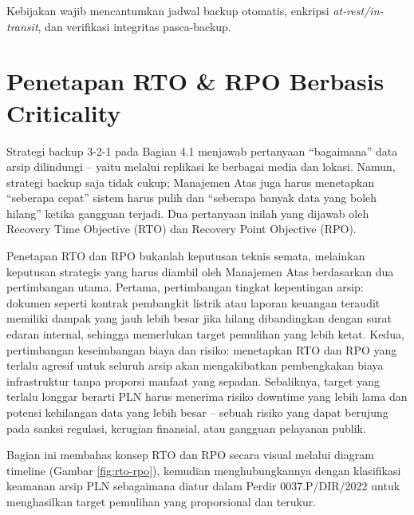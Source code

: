 \documentclass[12pt,a4paper]{report}
\begin{document}
Kebijakan wajib mencantumkan jadwal backup otomatis, enkripsi \textit{at-rest/in-transit}, dan verifikasi integritas pasca-backup.


\section{Penetapan RTO \& RPO Berbasis Criticality}

\small Strategi backup 3-2-1 pada Bagian 4.1 menjawab pertanyaan ``bagaimana'' data arsip dilindungi -- yaitu melalui replikasi ke berbagai media dan lokasi. Namun, strategi backup saja tidak cukup; Manajemen Atas juga harus menetapkan ``seberapa cepat'' sistem harus pulih dan ``seberapa banyak data yang boleh hilang'' ketika gangguan terjadi. Dua pertanyaan inilah yang dijawab oleh Recovery Time Objective (RTO) dan Recovery Point Objective (RPO).

Penetapan RTO dan RPO bukanlah keputusan teknis semata, melainkan keputusan strategis yang harus diambil oleh Manajemen Atas berdasarkan dua pertimbangan utama. Pertama, pertimbangan tingkat kepentingan arsip: dokumen seperti kontrak pembangkit listrik atau laporan keuangan teraudit memiliki dampak yang jauh lebih besar jika hilang dibandingkan dengan surat edaran internal, sehingga memerlukan target pemulihan yang lebih ketat. Kedua, pertimbangan keseimbangan biaya dan risiko: menetapkan RTO dan RPO yang terlalu agresif untuk seluruh arsip akan mengakibatkan pembengkakan biaya infrastruktur tanpa proporsi manfaat yang sepadan. Sebaliknya, target yang terlalu longgar berarti PLN harus menerima risiko downtime yang lebih lama dan potensi kehilangan data yang lebih besar -- sebuah risiko yang dapat berujung pada sanksi regulasi, kerugian finansial, atau gangguan pelayanan publik.

Bagian ini membahas konsep RTO dan RPO secara visual melalui diagram timeline (Gambar \ref{fig:rto-rpo}), kemudian menghubungkannya dengan klasifikasi keamanan arsip PLN sebagaimana diatur dalam Perdir 0037.P/DIR/2022 untuk menghasilkan target pemulihan yang proporsional dan terukur.

\end{document}
